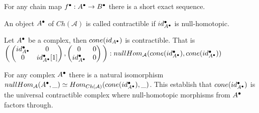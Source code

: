     \begin{remark}
        For any chain map $f^{\bullet}:A^{\bullet}\rightarrow B^{\bullet}$ there is a short exact sequence.
        \begin{center}
        \end{center}
    \end{remark}

    \begin{definition}
        An object $A^{\bullet}$ of $Ch(\mathcal{A})$ is called contractible if $id_{A^{\bullet}}^{\bullet}$ is null-homotopic.
    \end{definition}

    \begin{example}
        Let $A^{\bullet}$ be a complex, then $cone(id_{A^{\bullet}})$ is contractible. That is \\$\bigg(\begin{pmatrix} id_{A^{\bullet}}^{\bullet} & 0 \\ 0 & id_{A^{\bullet}}^{\bullet}[1]\end{pmatrix},\begin{pmatrix} 0 & 0 \\ id_{A^{\bullet}}^{\bullet} & 0 \end{pmatrix}\bigg):nullHom_{\mathcal{A}}(cone(id_{A^{\bullet}}^{\bullet}), cone(id_{A^{\bullet}}^{\bullet}))$
    \end{example}

    \begin{prop}
        For any complex $A^{\bullet}$ there is a natural isomorphism $nullHom_{\mathcal{A}}(A^{\bullet},\_)\simeq Hom_{Ch(\mathcal{A})}(cone(id_{A^{\bullet}}^{\bullet}),\_)$. This establish that $cone(id_{A^{\bullet}}^{\bullet})$ is the universal contractible complex where null-homotopic morphisms from $A^{\bullet}$ factors through.
    \end{prop}

